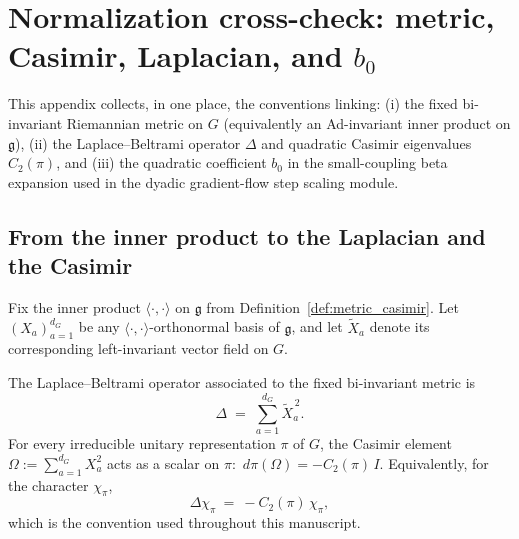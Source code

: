 \section{Normalization cross-check: metric, Casimir, Laplacian, and \texorpdfstring{$b_0$}{b0}}
\label{app:normalization_crosscheck}

This appendix collects, in one place, the conventions linking:
(i) the fixed bi-invariant Riemannian metric on $G$ (equivalently an Ad-invariant inner product on $\mathfrak g$),
(ii) the Laplace--Beltrami operator $\Delta$ and quadratic Casimir eigenvalues $C_2(\pi)$,
and (iii) the quadratic coefficient $b_0$ in the small-coupling beta expansion used in the dyadic gradient-flow step scaling module.

\subsection{From the inner product to the Laplacian and the Casimir}

Fix the inner product $\langle\cdot,\cdot\rangle$ on $\mathfrak g$ from Definition~\ref{def:metric_casimir}.
Let $(X_a)_{a=1}^{d_G}$ be any $\langle\cdot,\cdot\rangle$-orthonormal basis of $\mathfrak g$, and let $\widetilde X_a$ denote
its corresponding left-invariant vector field on $G$.

\begin{lemma}
\label{lem:laplacian_casimir_consistency}
The Laplace--Beltrami operator associated to the fixed bi-invariant metric is
\begin{equation}
\label{eq:laplacian_as_sum_squares}
\Delta\;=\;\sum_{a=1}^{d_G} \widetilde X_a^{\,2}.
\end{equation}
For every irreducible unitary representation $\pi$ of $G$, the Casimir element
$\Omega:=\sum_{a=1}^{d_G} X_a^2$ acts as a scalar on $\pi$:
$\,d\pi(\Omega)=-C_2(\pi)\,I$.
Equivalently, for the character $\chi_\pi$,
\begin{equation}
\label{eq:laplacian_character_eigen}
\Delta\chi_\pi\ =\ -C_2(\pi)\,\chi_\pi,
\end{equation}
which is the convention used throughout this manuscript.
\end{lemma}

